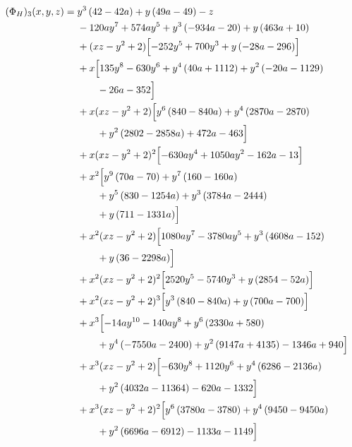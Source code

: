 \begingroup\footnotesize\allowdisplaybreaks[4]

\begin{align*}
(\Phi_H)_3(x,y,z)={}&y^{3} \left(42 - 42 a\right) + y \left(49 a - 49\right) - z\\
&{}- 120 a y^{7} + 574 a y^{5} + y^{3} \left(- 934 a - 20\right) + y \left(463 a + 10\right)\\
&{}+(xz-y^2+2)\Bigl[- 252 y^{5} + 700 y^{3} + y \left(- 28 a - 296\right)\Bigr]\\
&{}+x\Bigl[135 y^{8} - 630 y^{6} + y^{4} \left(40 a + 1112\right) + y^{2} \left(- 20 a - 1129\right)\\
&\qquad - 26 a - 352\Bigr]\\
&{}+x(xz-y^2+2)\Bigl[y^{6} \left(840 - 840 a\right) + y^{4} \left(2870 a - 2870\right)\\
&\qquad + y^{2} \left(2802 - 2858 a\right) + 472 a - 463\Bigr]\\
&{}+x(xz-y^2+2)^{2}\Bigl[- 630 a y^{4} + 1050 a y^{2} - 162 a - 13\Bigr]\\
&{}+x^{2}\Bigl[y^{9} \left(70 a - 70\right) + y^{7} \left(160 - 160 a\right)\\
&\qquad + y^{5} \left(830 - 1254 a\right) + y^{3} \left(3784 a - 2444\right)\\
&\qquad + y \left(711 - 1331 a\right)\Bigr]\\
&{}+x^{2}(xz-y^2+2)\Bigl[1080 a y^{7} - 3780 a y^{5} + y^{3} \left(4608 a - 152\right)\\
&\qquad + y \left(36 - 2298 a\right)\Bigr]\\
&{}+x^{2}(xz-y^2+2)^{2}\Bigl[2520 y^{5} - 5740 y^{3} + y \left(2854 - 52 a\right)\Bigr]\\
&{}+x^{2}(xz-y^2+2)^{3}\Bigl[y^{3} \left(840 - 840 a\right) + y \left(700 a - 700\right)\Bigr]\\
&{}+x^{3}\Bigl[- 14 a y^{10} - 140 a y^{8} + y^{6} \left(2330 a + 580\right)\\
&\qquad + y^{4} \left(- 7550 a - 2400\right) + y^{2} \left(9147 a + 4135\right) - 1346 a + 940\Bigr]\\
&{}+x^{3}(xz-y^2+2)\Bigl[- 630 y^{8} + 1120 y^{6} + y^{4} \left(6286 - 2136 a\right)\\
&\qquad + y^{2} \left(4032 a - 11364\right) - 620 a - 1332\Bigr]\\
&{}+x^{3}(xz-y^2+2)^{2}\Bigl[y^{6} \left(3780 a - 3780\right) + y^{4} \left(9450 - 9450 a\right)\\
&\qquad + y^{2} \left(6696 a - 6912\right) - 1133 a - 1149\Bigr]\\

\end{align*}
